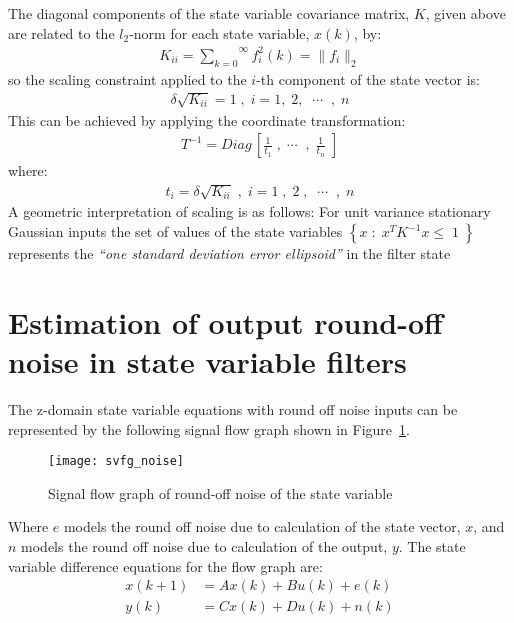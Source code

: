 \documentclass[a4paper,twoside,10pt,english]{report}
\begin{document}
The diagonal components of the state variable covariance matrix, $K$, given 
above are related to the $l_{2}$-norm for each state variable, 
$x\left(k\right)$, by:
\begin{align*}
K_{ii}=\overset{\infty}{\underset{k=0}{\sum}}f_{i}^{2}\left(k\right)=\|f_{i}\|_{2}
\end{align*}
so the scaling constraint applied to the $i$-th component of the state vector is:
\begin{align*}
\delta\sqrt{K_{ii}}=1\;,\;i=1,\;2,\;\;\cdots\;\;,\; n
\end{align*}
This can be achieved by applying the coordinate transformation:
\begin{align*}
T^{-1}=Diag\,\left[ \frac{1}{t_{1}}\;,\;\cdots\;\;,\;\frac{1}{t_{n}}\;\right]
\end{align*}
where:
\begin{align*}
t_{i}=\delta\sqrt{K_{ii}} \; , \; i=1\;,\;2\;,\;\;\cdots\;\;,\; n
\end{align*}
A geometric interpretation of scaling is as follows: For unit
variance stationary Gaussian inputs the set of values of the state
variables $\left\{ x\;:\; x^{{T}}K^{{-1}}x\le\;1\;\right\}$ represents
the \emph{``one standard deviation error ellipsoid''} in the filter state
\section{Estimation of output round-off noise in state variable filters\label{sec:Estimation-of-output-round-off-noise-in-state-variable-filters}}
The z-domain state variable equations with round off noise
inputs can be represented by the following signal flow graph shown in
Figure~\ref{fig:SVFG-noise}.
\begin{figure}[!htbp]
\begin{center}
\texttt{[image: svfg\_noise]}
\caption{Signal flow graph of round-off noise of the state variable}
\label{fig:SVFG-noise}
\end{center}
\end{figure}
Where $e$ models the round off noise due to calculation of the state vector,
$x$, and $n$ models the round off noise due to calculation of the output, $y$.
The state variable difference equations for the flow graph are:
\begin{align*}
x\left(k+1\right) &= Ax\left(k\right)+Bu\left(k\right)+e\left(k\right)\\
y\left(k\right) &= Cx\left(k\right)+Du\left(k\right)+n\left(k\right)
\end{align*}
\end{document}
